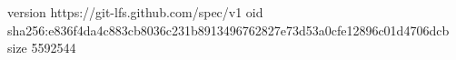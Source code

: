 version https://git-lfs.github.com/spec/v1
oid sha256:e836f4da4c883cb8036c231b8913496762827e73d53a0cfe12896c01d4706dcb
size 5592544
